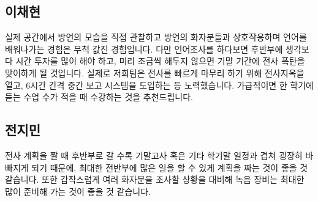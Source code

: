 \subsection{이채현}

실제 공간에서 방언의 모습을 직접 관찰하고 방언의 화자분들과 상호작용하며 언어를 배워나가는 경험은 무척 값진 경험입니다. 다만 언어조사를 하다보면 후반부에 생각보다 시간 투자를 많이 해야 하고, 미리 조금씩 해두지 않으면 기말 기간에 전사 폭탄을 맞이하게 될 것입니다. 실제로 저희팀은 전사를 빠르게 마무리 하기 위해 전사지옥을 열고, 6시간 간격 중간 보고 시스템을 도입하는 등 노력했습니다. 가급적이면 한 학기에 듣는 수업 수가 적을 때 수강하는 것을 추천드립니다.

\subsection{전지민}

전사 계획을 짤 때 후반부로 갈 수록 기말고사 혹은 기타 학기말 일정과 겹쳐 굉장히 바빠지게 되기 때문에, 최대한 전반부에 많은 일을 할 수 있게 계획을 짜는 것이 좋을 것 같습니다. 또한 갑작스럽게 여러 화자분을 조사할 상황을 대비해 녹음 장비는 최대한 많이 준비해 가는 것이 좋을 것 같습니다.